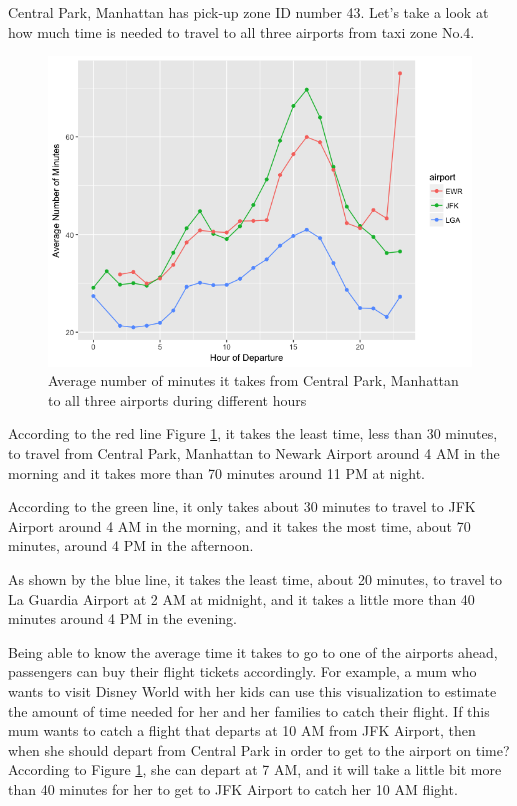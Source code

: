 \documentclass[12pt,twoside]{reedthesis}
\theoremstyle{definition}
\theoremstyle{definition}
\theoremstyle{definition}
\theoremstyle{remark}
\begin{document}
Central Park, Manhattan has pick-up zone ID number 43. Let's take a look
at how much time is needed to travel to all three airports from taxi
zone No.4.
\begin{figure}[h]
\includegraphics[width=5.67in]{figure/airport_vis} \caption{Average number of minutes it takes from Central Park, Manhattan to all three airports during different hours}\label{fig:airport-vis}
\end{figure}
According to the red line Figure \ref{fig:airport-vis}, it takes the
least time, less than 30 minutes, to travel from Central Park, Manhattan
to Newark Airport around 4 AM in the morning and it takes more than 70
minutes around 11 PM at night.

According to the green line, it only takes about 30 minutes to travel to
JFK Airport around 4 AM in the morning, and it takes the most time,
about 70 minutes, around 4 PM in the afternoon.

As shown by the blue line, it takes the least time, about 20 minutes, to
travel to La Guardia Airport at 2 AM at midnight, and it takes a little
more than 40 minutes around 4 PM in the evening.

Being able to know the average time it takes to go to one of the
airports ahead, passengers can buy their flight tickets accordingly. For
example, a mum who wants to visit Disney World with her kids can use
this visualization to estimate the amount of time needed for her and her
families to catch their flight. If this mum wants to catch a flight that
departs at 10 AM from JFK Airport, then when she should depart from
Central Park in order to get to the airport on time? According to Figure
\ref{fig:airport-vis}, she can depart at 7 AM, and it will take a little
bit more than 40 minutes for her to get to JFK Airport to catch her 10
AM flight.
\end{document}
